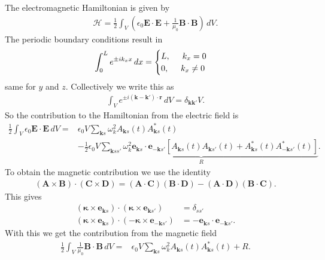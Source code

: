 \documentclass{book}
\theoremstyle{definition}
\newcommand{\ham}{\mathcal{H}}
\newcommand{\f}[2]{\frac{#1}{#2}}
\newcommand{\lp}{\left(}
\newcommand{\rp}{\right)}
\newcommand{\lb}{\left[}
\newcommand{\rb}{\right]}
\begin{document}
The electromagnetic Hamiltonian is given by
\begin{align}
\ham = \f{1}{2}\int_V \lp \epsilon_0 \mathbf{E}\cdot \mathbf{E} + \f{1}{\mu_0} \mathbf{B}\cdot\mathbf{B} \rp\,dV.
\end{align}
The periodic boundary conditions result in
\begin{align}
\int_0^L e^{\pm i k_x x}\,dx = \begin{cases}
L,\hspace{0.5cm} k_x = 0\\
0,\hspace{0.5cm} k_x \neq 0
\end{cases}
\end{align}
same for $y$ and $z$. Collectively we write this as
\begin{align}
\int_V e^{\pm i(\mathbf{k} - \mathbf{k}')\cdot\mathbf{r}} \, dV = \delta_{\mathbf{k}\mathbf{k}'}V.
\end{align}
So the contribution to the Hamiltonian from the electric field is
\begin{align}
\f{1}{2}\int_V \epsilon_0 \mathbf{E}\cdot\mathbf{E}\,dV = &\epsilon_0 V \sum_{\mathbf{k}s}\omega_k^2 A_{\mathbf{k}s}(t)A^*_{\mathbf{k}s}(t) \\
& - \underbrace{\f{1}{2}\epsilon_0 V\sum_{\mathbf{k}ss'}\omega^2_k \mathbf{e}_{\mathbf{k}s}\cdot \mathbf{e}_{-\mathbf{k}s'}\lb A_{\mathbf{k}s}(t)A_{\mathbf{k}s'}(t) + A^*_{\mathbf{k}s}(t)A^*_{-\mathbf{k}s'}(t) \rb}_R.
\end{align}
To obtain the magnetic contribution we use the identity
\begin{align}
(\mathbf{A}\times \mathbf{B})\cdot (\mathbf{C}\times \mathbf{D}) = (\mathbf{A}\cdot\mathbf{C})(\mathbf{B}\cdot \mathbf{D}) - (\mathbf{A}\cdot\mathbf{D})(\mathbf{B}\cdot\mathbf{C}).
\end{align}
This gives
\begin{align}
(\mathbf{\kappa}\times \mathbf{e}_{\mathbf{k}s})\cdot(\mathbf{\kappa}\times \mathbf{e}_{\mathbf{k}s'}) &= \delta_{ss'}\\
(\mathbf{\kappa}\times \mathbf{e}_{\mathbf{k}s})\cdot(-\mathbf{\kappa}\times \mathbf{e}_{-\mathbf{k}s'}) &= -\mathbf{e}_{\mathbf{k}s}\cdot \mathbf{e}_{-\mathbf{k}s'}.
\end{align}
With this we get the contribution from the magnetic field
\begin{align}
\f{1}{2}\int_V \f{1}{\mu_0}\mathbf{B}\cdot\mathbf{B}\,dV = &\epsilon_0 V \sum_{\mathbf{k}s}\omega^2_k A_{\mathbf{k}s}(t)A^*_{\mathbf{k}s}(t) + R.
\end{align}
\end{document}
